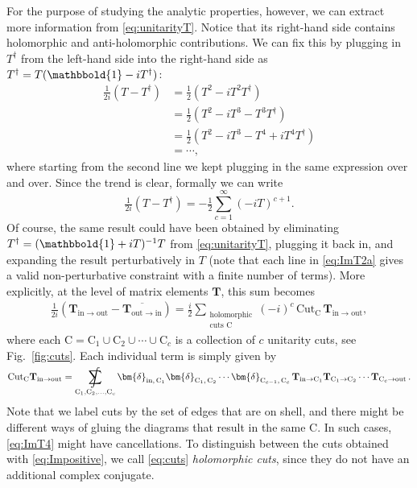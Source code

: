 \documentclass[12pt]{article}
\newcommand*{\boldone}{\mathbbold{1}}
\numberwithin{figure}{section}
\def \be {\begin{equation}}
\def \ee {\end{equation}}
\def \nn {\nonumber}
\def \CC {C}
\def \CC {\mathrm{C}}
\def \inn {\mathrm{in}}
\def \out {\mathrm{out}}
\def \T {\mathbf{T}}
\newcommand{\cut}{\text{Cut}}
\newcommand{\bdelta}[2]{\bm{\delta}_{#1 , \, #2}}
\DeclareMathOperator*{\sumint}{%
\mathchoice%
  {\ooalign{$\displaystyle\sum$\cr\hidewidth$\displaystyle\int$\hidewidth\cr}}
  {\ooalign{\raisebox{.14\height}{\scalebox{.7}{$\textstyle\sum$}}\cr\hidewidth$\textstyle\int$\hidewidth\cr}}
  {\ooalign{\raisebox{.2\height}{\scalebox{.6}{$\scriptstyle\sum$}}\cr$\scriptstyle\int$\cr}}
  {\ooalign{\raisebox{.2\height}{\scalebox{.6}{$\scriptstyle\sum$}}\cr$\scriptstyle\int$\cr}}
}
\begin{document}
	For the purpose of studying the analytic properties, however, we can extract more information from \eqref{eq:unitarityT}. Notice that its right-hand side contains holomorphic and anti-holomorphic contributions. We can fix this by plugging in $T^\dagger$ from the left-hand side into the right-hand side as $T^\dagger = T(\boldone - iT^\dagger)$: 
	\begin{align}\label{eq:ImT2a}
	\tfrac{1}{2i}(T - T^\dagger) &= \tfrac{1}{2} (T^2 - iT^2 T^\dagger)\nn\\
	&= \tfrac{1}{2} (T^2 - iT^3 - T^3 T^\dagger)\\
	&= \tfrac{1}{2} (T^2 - iT^3 - T^4 + i T^4 T^\dagger)\nn\\
	&= \cdots,\nn
	\end{align}
	where starting from the second line we kept plugging in the same expression over and over. Since the trend is clear, formally we can write
	\be\label{eq:ImT3}
	\boxed{
	\tfrac{1}{2i}(T - T^\dagger) =   -\tfrac{1}{2}\sum_{c=1}^{\infty} (-i T)^{c+1}.}
	\ee
	Of course, the same result could have been obtained by eliminating
	$T^\dagger = (\boldone + iT)^{-1}T$ from \eqref{eq:unitarityT}, plugging it back in, and expanding the result perturbatively in $T$ (note that each line in \eqref{eq:ImT2a} gives a valid non-perturbative constraint with a finite number of terms). More explicitly, at the level of matrix elements $\T$, this sum becomes
	\begin{align}\label{eq:ImT4}
	\tfrac{1}{2i}(\T_{\inn\to\out} - \overline{\T_{\out\to\inn}}) = \tfrac{i}{2} \!\!\!\! \sum_{\substack{\text{holomorphic}\\ \text{cuts C}}}\!\!\! \left(-i\right)^c \, \cut_{\mathrm{C}} \, \T_{\inn \to \out},
	\end{align}
	where each $\mathrm{C} = \mathrm{C}_1 \cup \mathrm{C}_2 \cup \cdots \cup \mathrm{C}_c$ is a collection of $c$ unitarity cuts, see Fig.~\ref{fig:cuts}. Each individual term is simply given by
	\be\label{eq:holomorphic-cuts}
	\cut_{\mathrm{C}} \T_{\inn \to \out} = \sumint_{\mathrm{C}_1, \mathrm{C}_2,\ldots,\mathrm{C}_c} \bdelta{\inn}{\mathrm{C}_1} \bdelta{\mathrm{C}_1}{\mathrm{C}_2} \cdots \bdelta{\mathrm{C}_{c-1}}{\mathrm{C}_c}\,
	\T_{\inn\to \mathrm{C}_1} \T_{\mathrm{C}_1\to \mathrm{C}_2} \cdots \T_{\mathrm{C}_c\to \out} \,.
	\ee 
	Note that we label cuts by the set of edges that are on shell, and there might be different ways of gluing the diagrams that result in the same $\CC$. In such cases, \eqref{eq:ImT4} might have cancellations. To distinguish between the cuts obtained with \eqref{eq:Impositive}, we call \eqref{eq:cuts} \emph{holomorphic cuts}, since they do not have an additional complex conjugate.
	
\end{document}
